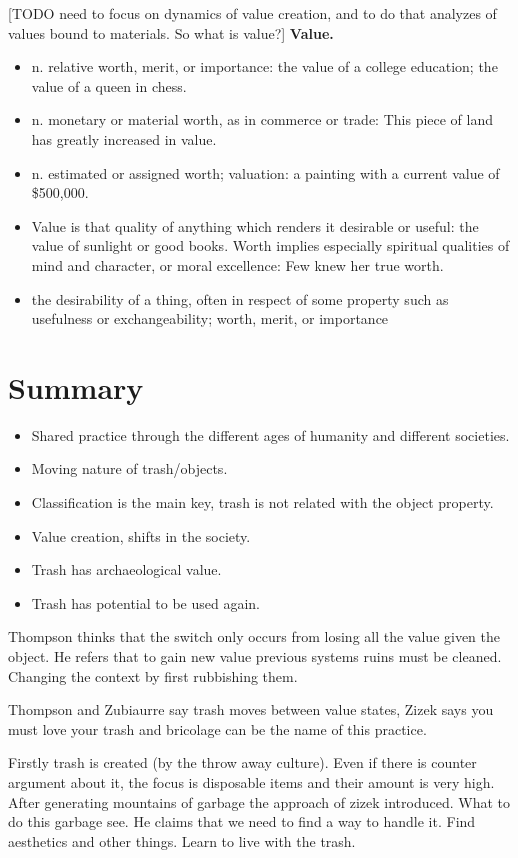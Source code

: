 [TODO need to focus on dynamics of value creation, and to do that analyzes of values bound to materials. So what is value?]
\textbf{Value.}
\begin{itemize}
\item n. relative worth, merit, or importance: the value of a college education; the value of a queen in chess.
\item n. monetary or material worth, as in commerce or trade: This piece of land has greatly increased in value.
\item n. estimated or assigned worth; valuation: a painting with a current value of \$500,000.
\item Value is that quality of anything which renders it desirable or useful: the value of sunlight or good books. Worth implies especially spiritual qualities of mind and character, or moral excellence: Few knew her true worth.
\item the desirability of a thing, often in respect of some property such as usefulness or exchangeability; worth, merit, or importance
\end{itemize}


\section{Summary}
\begin{itemize}
\item Shared practice through the different ages of humanity and different societies. 
\item Moving nature of trash/objects.
\item Classification is the main key, trash is not related with the object property. 
\item Value creation, shifts in the society. 
\item Trash has archaeological value.
\item Trash has potential to be used again.
\end{itemize}

Thompson thinks that the switch only occurs from losing all the value given the object. He refers that to gain new value previous systems ruins must be cleaned. Changing the context by first rubbishing them.

Thompson and Zubiaurre say trash moves between value states, Zizek says you must love your trash and bricolage can be the name of this practice.

Firstly trash is created (by the throw away culture). Even if there is counter argument about it, the focus is disposable items and their amount is very high. After generating mountains of garbage the approach of zizek introduced. What to do this garbage see. He claims that we need to find a way to handle it. Find aesthetics and other things. Learn to live with the trash.

